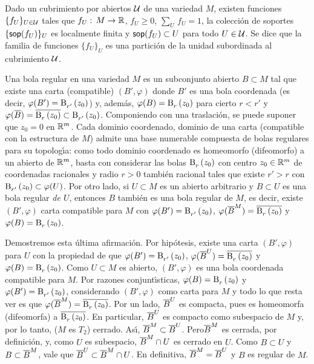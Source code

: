\theoremstyle{plain}

\theoremstyle{remark}


Dado un cubrimiento por abiertos $\cal U$ de una variedad $M$, existen
funciones $\{f_U\}_{U\in\cal U}$ tales que $f_U:\,M\rightarrow\bb R$,
$f_U\geq 0$, $\sum_U\,f_U=1$, la colecci\'{o}n de soportes
$\{\soporte{f_U}\}_U$ es localmente finita y $\soporte{f_U}\subset U$ para todo
$U\in\cal U$. Se dice que la familia de funciones $\{f_U\}_U$ es una
partici\'{o}n de la unidad subordinada al cubrimiento $\cal U$.

Una bola regular en una variedad $M$ es un subconjunto abierto $B\subset M$ tal
que existe una carta (compatible) $(B',\varphi)$ donde $B'$ es una bola
coordenada (es decir, $\varphi(B')=\bola{r'}{z_0}$) y, adem\'{a}s,
$\varphi(B)=\bola{r}{z_0}$ para cierto $r<r'$ y
$\varphi(\clos B)=\clos{\bola{r}{z_0}}\subset\bola{r'}{z_0}$. Componiendo con
una traslaci\'{o}n, se puede suponer que $z_0=0$ en $\bb R^m$. Cada dominio
coordenado, dominio de una carta (compatible con la estructura de $M$) admite
una base numerable compuesta de bolas regulares para su topolog\'{\i}a: como
todo dominio coordenado es homeomorfo (difeomorfo) a un abierto de $\bb R^m$,
basta con considerar las bolas $\bola{r}{z_0}$ con centro $z_0\in\bb R^m$ de
coordenadas racionales y radio $r>0$ tambi\'{e}n racional tales que existe
$r'>r$ con $\bola{r'}{z_0}\subset\varphi(U)$. Por otro lado, si $U\subset M$ es
un abierto arbitrario y $B\subset U$ es una bola regular \emph{de $U$},
entonces $B$ tambi\'{e}n es una bola regular de $M$, es decir, existe
$(B',\varphi)$ carta compatible para $M$ con $\varphi(B')=\bola{r'}{z_0}$,
$\varphi(\clos B^M)=\clos{\bola{r}{z_0}}$ y $\varphi(B)=\bola{r}{z_0}$.

Demostremos esta \'{u}ltima afirmaci\'{o}n. Por hip\'{o}tesis, existe una carta
$(B',\varphi)$ para $U$ con la propiedad de que $\varphi(B')=\bola{r'}{z_0}$,
$\varphi(\clos B^U)=\clos{\bola{r}{z_0}}$ y $\varphi(B)=\bola{r}{z_0}$. Como
$U\subset M$ es abierto, $(B',\varphi)$ es una bola coordenada compatible para
$M$. Por razones conjunt\'{\i}sticas, $\varphi(B)=\bola{r}{z_0}$ y
$\varphi(B')=\bola{r'}{z_0}$, considerando $(B',\varphi)$ como carta para $M$ y
todo lo que resta ver es que $\varphi(\clos B^M)=\clos{\bola{r}{z_0}}$. Por un
lado, $\clos B^U$ es compacta, pues es homeomorfa (difeomorfa) a
$\clos{\bola{r}{z_0}}$. En particular, $\clos B^U$ es compacto como subespacio
de $M$ y, por lo tanto, ($M$ es $T_2$) cerrado. As\'{\i},
$\clos B^M\subset\clos B^U$. Pero$\clos B^M$ es cerrada, por definici\'{o}n, y,
como $U$ es subespacio, $\clos B^M\cap U$ es cerrado en $U$. Como $B\subset U$
y $B\subset\clos B^M$, vale que $\clos B^U\subset\clos B^M\cap U$. En
definitiva, $\clos B^M=\clos B^U$ y $B$ es regular de $M$.

